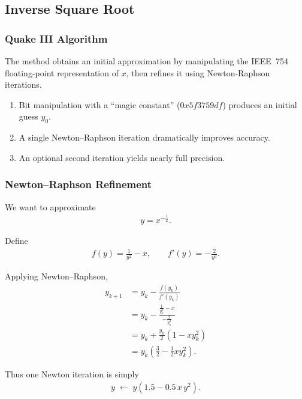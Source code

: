 \documentclass[conference]{IEEEtran}
\begin{document}
\subsection{Inverse Square Root}


\subsubsection*{Quake III Algorithm}

The method obtains an initial approximation by manipulating the IEEE~754 floating-point representation of $x$, then refines it using Newton-Raphson iterations.

\begin{enumerate}
    \item Bit manipulation with a ``magic constant'' ($0x5f3759df$) produces an initial guess $y_0$.
    \item A single Newton--Raphson iteration dramatically improves accuracy.
    \item An optional second iteration yields nearly full precision. \\
\end{enumerate} 

\subsubsection*{Newton--Raphson Refinement}

We want to approximate
\begin{align} 
y = x^{-\frac{1}{2}}.
\end{align}

Define
\begin{align}
f(y) = \frac{1}{y^2} - x, \qquad f'(y) = -\frac{2}{y^3}.
\end{align}

Applying Newton--Raphson,
\begin{align}
y_{k+1} &= y_k - \frac{f(y_k)}{f'(y_k)} \\[6pt]
        &= y_k - \frac{\tfrac{1}{y_k^2} - x}{-\tfrac{2}{y_k^3}} \\[6pt]
        &= y_k + \frac{y_k}{2}\left(1 - x y_k^2 \right) \\[6pt]
        &= y_k \left(\tfrac{3}{2} - \tfrac{1}{2} x y_k^2\right).
\end{align}

Thus one Newton iteration is simply
\begin{align}
y \;\gets\; y \left( 1.5 - 0.5 \, x \, y^2 \right).
\end{align}
\end{document}
